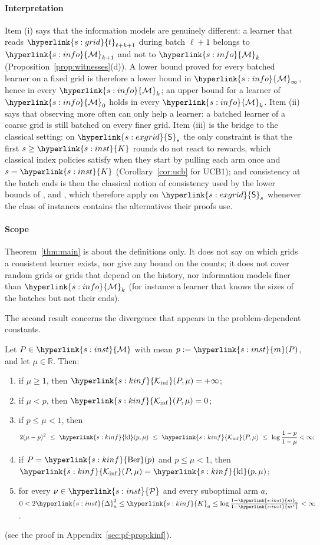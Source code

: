 \documentclass[11pt]{article}
\newcommand{\sy}[2]{{\hyperlink{#1}{#2}}}
\newcommand{\1}{\mathbf{1}}
\newcommand{\R}{\mathbb{R}}
\newcommand{\Kar}{\sy{s:inst}{K}}
\newcommand{\Mu}{\sy{s:inst}{\mathcal M}}
\newcommand{\mean}{\sy{s:inst}{m}}
\newcommand{\ms}{\sy{s:inst}{m^\star}}
\newcommand{\Dg}{\sy{s:inst}{\Delta}}
\newcommand{\cP}{\sy{s:inst}{\mathcal P}}
\newcommand{\Ber}{\sy{s:kinf}{\mathrm{Ber}}}
\newcommand{\kl}{\sy{s:kinf}{\mathrm{kl}}}
\newcommand{\Ki}{\sy{s:kinf}{\mathcal K_{\inf}}}
\newcommand{\Ka}{\sy{s:kinf}{K}}
\newcommand{\tl}{\sy{s:grid}{t}}
\newcommand{\Sq}{\sy{s:exgrid}{\mathsf S}}
\newcommand{\Mk}[1]{\sy{s:info}{\mathcal M}_{#1}}
\begin{document}
\paragraph{Interpretation} Item (i) says that the information models are genuinely different: a
learner that reads $\tl_{\ell+k+1}$ during batch $\ell+1$ belongs to $\Mk{k+1}$ and not to $\Mk{k}$
(Proposition~\ref{prop:witnesses}(d)). A lower bound proved for every batched learner on a fixed
grid is therefore a lower bound in $\Mk{\infty}$, hence in every $\Mk{k}$; an upper bound for a learner
of $\Mk{0}$ holds in every $\Mk{k}$. Item (ii) says that observing more often can only help a learner:
a batched learner of a coarse grid is still batched on every finer grid. Item (iii) is the bridge to
the classical setting: on $\Sq_s$ the only constraint is that the first $s\ge\Kar$ rounds do not
react to rewards, which classical index policies satisfy when they start by pulling each arm once
and $s=\Kar$ (Corollary~\ref{cor:ucb} for UCB1); and consistency at the batch ends is then the classical notion of consistency used
by the lower bounds of \citet{LR85}, \citet{BK96} and \citet[Theorem~16.2]{LS}, which therefore
apply on $\Sq_s$ whenever the class of instances contains the alternatives their proofs use.

\paragraph{Scope} Theorem~\ref{thm:main} is about the definitions only. It does not say on which
grids a consistent learner exists, nor give any bound on the counts; it does not cover random grids
or grids that depend on the history, nor information models finer than $\Mk{k}$ (for instance a
learner that knows the sizes of the batches but not their ends).

The second result concerns the divergence that appears in the problem-dependent constants.

\begin{proposition}\label{prop:kinf}
Let $P\in\Mu$ with mean $p:=\mean(P)$, and let $\mu\in\R$. Then:
\begin{enumerate}[label=(\roman*)]
\item if $\mu\ge1$, then $\Ki(P,\mu)=+\infty$;
\item if $\mu<p$, then $\Ki(P,\mu)=0$;
\item if $p\le \mu<1$, then
  \begin{equation*}
    2(\mu-p)^2\ \le\ \kl(p,\mu)\ \le\ \Ki(P,\mu)\ \le\ \log\frac{1-p}{1-\mu}<\infty ;
  \end{equation*}
\item if $P=\Ber(p)$ and $p\le \mu<1$, then $\Ki(P,\mu)=\kl(p,\mu)$;
\item for every $\nu\in\cP$ and every suboptimal arm $a$,
  $0<2\Dg_a^2\le \Ka_a\le\log\frac{1-\mean_a}{1-\ms}<\infty$.
\end{enumerate}
\end{proposition}
(see the proof in Appendix~\ref{sec:pf-prop:kinf}).
\end{document}
